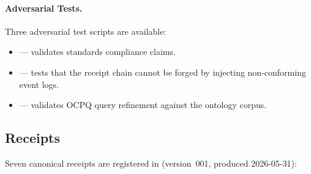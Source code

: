 \paragraph{Adversarial Tests.}
Three adversarial test scripts are available:
\begin{itemize}
  \item {} --- validates standards compliance claims.
  \item {} --- tests that the receipt
        chain cannot be forged by injecting non-conforming event logs.
  \item {} --- validates OCPQ query
        refinement against the ontology corpus.
\end{itemize}

\subsection{Receipts}
\label{sec:research-open-ontologies-receipts}

Seven canonical receipts are registered in 
(version~001, produced 2026-05-31):


